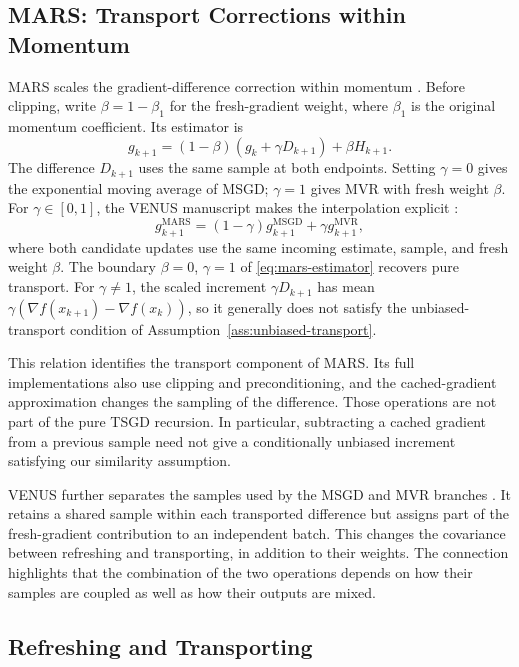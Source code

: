 \subsection{MARS: Transport Corrections within Momentum}
\label{subsec:mars-transport}

MARS scales the gradient-difference correction within momentum
\citep{yuan2025mars}. Before clipping, write $\beta=1-\beta_1$ for
the fresh-gradient weight, where $\beta_1$ is the original momentum
coefficient. Its estimator is
\begin{equation}
\label{eq:mars-estimator}
g_{k+1}=(1-\beta)(g_k+\gamma D_{k+1})+\beta H_{k+1}.
\end{equation}
The difference $D_{k+1}$ uses the same sample at both endpoints.
Setting $\gamma=0$ gives the exponential moving average of MSGD;
$\gamma=1$ gives MVR with fresh weight $\beta$. For
$\gamma\in[0,1]$, the VENUS manuscript makes the interpolation explicit
\citep{venus2026draft}:
\[
g_{k+1}^{\mathrm{MARS}}
=(1-\gamma)g_{k+1}^{\mathrm{MSGD}}
 +\gamma g_{k+1}^{\mathrm{MVR}},
\]
where both candidate updates use the same incoming estimate, sample,
and fresh weight $\beta$. The boundary $\beta=0$, $\gamma=1$ of
\eqref{eq:mars-estimator} recovers pure transport.
For $\gamma\ne1$, the scaled increment $\gamma D_{k+1}$ has mean
$\gamma(\nabla f(x_{k+1})-\nabla f(x_k))$, so it generally does not
satisfy the unbiased-transport condition of
Assumption~\ref{ass:unbiased-transport}.

This relation identifies the transport component of MARS. Its full
implementations also use clipping and preconditioning, and the
cached-gradient approximation changes the sampling of the difference.
Those operations are not part of the pure TSGD recursion. In particular,
subtracting a cached gradient from a previous sample need not give a
conditionally unbiased increment satisfying our similarity assumption.

VENUS further separates the samples used by the MSGD and MVR branches
\citep{venus2026draft}. It retains a shared sample within each transported
difference but assigns part of the fresh-gradient contribution to an
independent batch. This changes the covariance between refreshing and
transporting, in addition to their weights. The connection highlights
that the combination of the two operations depends on how their samples
are coupled as well as how their outputs are mixed.

\subsection{Refreshing and Transporting}
\label{subsec:refreshing-and-transporting}

